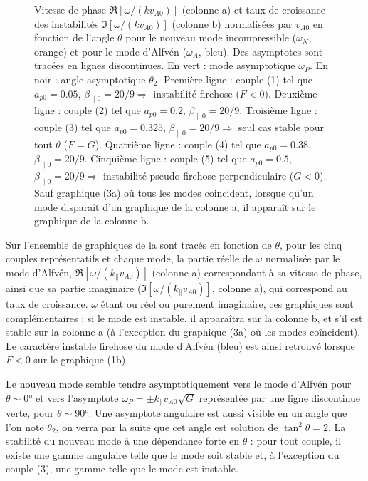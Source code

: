 \begin{figure}[!ht]
\caption{Vitesse de phase $\Re[\omega/(kv_{A0})]$ (colonne a) et taux de croissance des instabilités $\Im[\omega/(kv_{A0})]$ (colonne b) normalisées par $v_{A0}$ en fonction de l'angle $\theta$ pour le nouveau mode incompressible ($\omega_N$, orange) et pour le mode d'Alfvén ($\omega_A$, bleu). Des asymptotes sont tracées en lignes discontinues. En vert : mode asymptotique $\omega_P$. En noir : angle asymptotique $\theta_2$. Première ligne : couple (1) tel que $a_{p0} = 0.05$, $\beta_{\parallel 0} = 20/9 \Rightarrow$ instabilité firehose ($F<0$). Deuxième ligne : couple (2) tel que $a_{p0} = 0.2$, $\beta_{\parallel 0} = 20/9 $. Troisième ligne : couple (3) tel que $a_{p0} = 0.325$, $\beta_{\parallel 0} = 20/9 \Rightarrow$ seul cas stable pour tout $\theta$ ($F=G$). Quatrième ligne : couple (4) tel que $a_{p0} = 0.38$, $\beta_{\parallel 0} = 20/9  $. Cinquième ligne : couple (5) tel que $a_{p0} = 0.5$, $\beta_{\parallel 0} = 20/9  \Rightarrow$ instabilité pseudo-firehose perpendiculaire ($G<0$). Sauf graphique (3a) où tous les modes coincident, lorsque qu'un mode disparaît d'un graphique de la colonne a, il apparaît sur le graphique de la colonne b.}
\label{fig:lin_omega_theta}
\end{figure}
Sur l'ensemble de graphiques de la  sont tracés en fonction de $\theta$, pour les cinq couples représentatifs et chaque mode, la partie réelle de $\omega$ normalisée par le mode d'Alfvén, $\Re[\omega/(k_{\parallel}v_{A0})]$ (colonne a) correspondant à sa vitesse de phase, ainsi que sa partie imaginaire ($\Im[\omega/(k_{\parallel}v_{A0})]$, colonne a), qui correspond au taux de croissance. $\omega$ étant ou réel ou purement imaginaire, ces graphiques sont complémentaires : si le mode est instable, il apparaîtra sur la colonne b, et s'il est stable sur la colonne a (à l'exception du graphique (3a) où les modes coîncident). Le caractère instable firehose du mode d'Alfvén (bleu) est ainsi retrouvé lorsque $F<0$ sur le graphique (1b). 

Le nouveau mode semble tendre asymptotiquement vers le mode d'Alfvén pour $\theta \sim \ang{0}$ et vers l'asymptote $\omega_P = \pm k_{\parallel}v_{A0} \sqrt{G}$ représentée par une ligne discontinue verte, pour $\theta \sim \ang{90}$. Une asymptote angulaire est aussi visible en un angle que l'on note $\theta_2$, on verra par la suite que cet angle est solution de $\tan^2 \theta = 2$. La stabilité du nouveau mode à une dépendance forte en $\theta$ : pour tout couple, il existe une gamme angulaire telle que le mode soit stable et, à l'exception du couple (3), une gamme telle que le mode est instable. 

